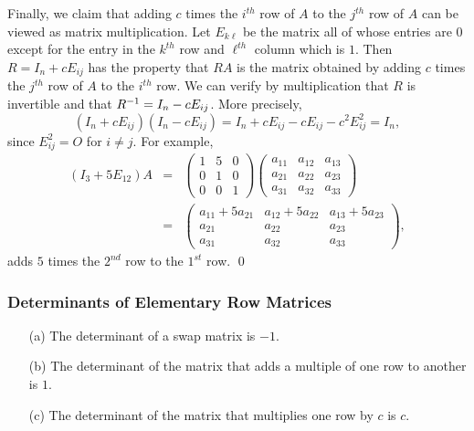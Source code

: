 \documentclass{ximera}
\begin{document}
Finally, we claim that adding $c$ times the $i^{th}$ row of $A$
to the $j^{th}$ row of $A$ can be viewed as matrix
multiplication.  Let $E_{k\ell}$ be the matrix all of whose
entries are $0$ except for the entry in the $k^{th}$ row and
$\ell^{th}$ column which is $1$.  Then $R=I_n+cE_{ij}$ has the
property that $RA$ is the matrix obtained by adding $c$ times
the $j^{th}$ row of $A$ to the $i^{th}$ row.  We can verify by
multiplication that $R$ is invertible and that
$R^{-1}=I_n-cE_{ij}$.  More precisely,
\[
(I_n+cE_{ij})(I_n-cE_{ij})=I_n+cE_{ij}-cE_{ij}-c^2E_{ij}^2=I_n,
\]
since $E_{ij}^2 = O$ for $i\not= j$.  For example,
\begin{eqnarray*}
(I_3 + 5E_{12})A &  = & \left(\begin{array}{ccc} 1 & 5 & 0\\ 0 & 1 & 0 \\ 0 & 0 & 1\end{array}\right)
\left(\begin{array}{ccc} a_{11} & a_{12} & a_{13}\\ a_{21} & a_{22} & a_{23}
 \\ a_{31} & a_{32} & a_{33} \end{array}\right) \\ & = & 
\left(\begin{array}{ccc} a_{11}+5a_{21} & a_{12}+5a_{22} & a_{13}+5a_{23} \\ 
a_{21} & a_{22} & a_{23} \\ a_{31} & a_{32} & a_{33} \end{array}\right),
\end{eqnarray*}
adds $5$ times the $2^{nd}$ row to the $1^{st}$ row.   \qed

\subsubsection*{Determinants of Elementary Row Matrices}

\begin{lemma}  \label{L:detelemrowmat}
\begin{itemize}
\item[(a)] The determinant of a swap matrix is $-1$.
\item[(b)] The determinant of the matrix that adds a multiple
of one row to another is $1$.
\item[(c)] The determinant of the matrix that multiplies one
row by $c$ is $c$.
\end{itemize}
\end{lemma}  
 
\end{document}
